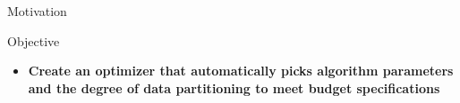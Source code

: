 \documentclass[final]{beamer}
\begin{document}
{\begin{frame}{}
\begin{center}
\begin{columns}[t]
\begin{column}{0.32\textwidth}
\begin{block}{\huge Motivation}
\end{block}
\vspace{1.2cm}

    \begin{block}{\huge Objective}
\vspace{.4cm}
\begin{itemize}
\item {\bf \large Create an optimizer that automatically picks algorithm parameters and the degree of data partitioning to meet budget specifications}
\end{itemize}

\vspace{.5cm}

\end{block}

\vspace{1.2cm}


\end{column}
\end{columns}
\end{center}
\end{frame}}
\end{document}
